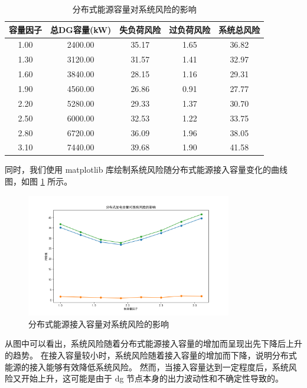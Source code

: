 \documentclass{article}
\begin{document}
\begin{table}[H]
  \centering
  \begin{tabular}{ccccc}
    \toprule
    容量因子 & 总DG容量(kW) & 失负荷风险 & 过负荷风险 & 系统总风险 \\
    \midrule
    1.00 & 2400.00 & 35.17 & 1.65 & 36.82 \\
    1.30 & 3120.00 & 31.57 & 1.41 & 32.97 \\
    1.60 & 3840.00 & 28.15 & 1.16 & 29.31 \\
    1.90 & 4560.00 & 26.86 & 0.91 & 27.77 \\
    2.20 & 5280.00 & 29.33 & 1.37 & 30.70 \\
    2.50 & 6000.00 & 32.53 & 1.22 & 33.75 \\
    2.80 & 6720.00 & 36.09 & 1.96 & 38.05 \\
    3.10 & 7440.00 & 39.68 & 1.90 & 41.58 \\
    \bottomrule
  \end{tabular}
  \caption{分布式能源容量对系统风险的影响}
  \label{tab:risk_evolution}
\end{table}

同时，我们使用 matplotlib 库绘制系统风险随分布式能源接入容量变化的曲线图，如图 \ref{fig:risk_evolution} 所示。

\begin{figure}[H]
  \centering
  \includegraphics[width=0.8\textwidth]{problem2/dg_capacity_trending.png}
  \caption{分布式能源接入容量对系统风险的影响}
  \label{fig:risk_evolution}
\end{figure}

从图中可以看出，系统风险随着分布式能源接入容量的增加而呈现出先下降后上升的趋势。
在接入容量较小时，系统风险随着接入容量的增加而下降，说明分布式能源的接入能够有效降低系统风险。
然而，当接入容量达到一定程度后，系统风险又开始上升，这可能是由于 dg 节点本身的出力波动性和不确定性导致的。
\end{document}
